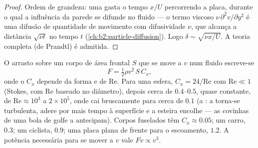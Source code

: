 \begin{proof}
Ordem de grandeza: uma  gasta o tempo $x/U$ percorrendo
a placa, durante o qual a influência da parede se difunde no
fluido --- o termo viscoso $\nu\,\partial^2v/\partial y^2$ é uma difusão de
quantidade de movimento com difusividade $\nu$, que alcança a distância $\sqrt{\nu t}$ no
tempo $t$ (\cref{ch:b2:particle-diffusion}). Logo $\delta \sim \sqrt{\nu x
/U}$. A teoria completa (de Prandtl) é admitida.
\end{proof}

\begin{proposition}\label{prop:b2:viscous-flows:drag}
O arrasto sobre um corpo de área frontal $S$ que se move a $v$ num fluido
escreve-se
\[
F = \tfrac12\rho v^2\,S\,C_x ,
\]
onde o \emph{} $C_x$ depende da forma e de
$\mathrm{Re}$. Para uma esfera, $C_x = 24/\mathrm{Re}$ com $\mathrm{Re} \ll 1$ (Stokes,
com $\mathrm{Re}$ baseado no diâmetro), depois cerca de $0.4$--$0.5$, quase
constante, de $\mathrm{Re} \approx 10^3$ a $2 \times 10^5$, onde cai
bruscamente para cerca de $0.1$ (a \emph{}: a  torna-se
turbulenta, adere por mais tempo à superfície e a esteira encolhe --- as
covinhas de uma bola de golfe a antecipam). Corpos fuselados têm
$C_x \approx 0.05$; um carro, $0.3$; um ciclista, $0.9$; uma placa plana de frente para o escoamento,
$1.2$. A potência necessária para se mover a $v$ vale $Fv \propto v^3$.
\end{proposition}
\admitted

